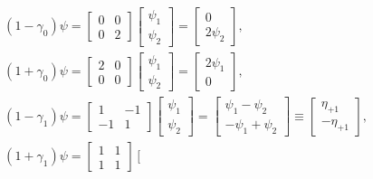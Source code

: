 \begin{equation*}
    \begin{aligned}
        & \left(1-\gamma_0\right) \psi=\left[\begin{array}{ll}
        0 & 0 \\
        0 & 2
        \end{array}\right]\left[\begin{array}{l}
        \psi_1 \\
        \psi_2
        \end{array}\right]=\left[\begin{array}{c}
        0 \\
        2 \psi_2
        \end{array}\right], \\
        & \left(1+\gamma_0\right) \psi=\left[\begin{array}{ll}
        2 & 0 \\
        0 & 0
        \end{array}\right]\left[\begin{array}{l}
        \psi_1 \\
        \psi_2
        \end{array}\right]=\left[\begin{array}{c}
        2 \psi_1 \\
        0
        \end{array}\right], \\
        & \left(1-\gamma_1\right) \psi=\left[\begin{array}{cc}
        1 & -1 \\
        -1 & 1
        \end{array}\right]\left[\begin{array}{l}
        \psi_1 \\
        \psi_2
        \end{array}\right]=\left[\begin{array}{c}
        \psi_1-\psi_2 \\
        -\psi_1+\psi_2
        \end{array}\right] \equiv\left[\begin{array}{c}
        \eta_{+1} \\
        -\eta_{+1}
        \end{array}\right], \\
        & \left(1+\gamma_1\right) \psi=\left[\begin{array}{ll}
        1 & 1 \\
        1 & 1
        \end{array}\right]\left[\begin{array}{l}

\end{array}
\end{aligned}
\end{equation*}
